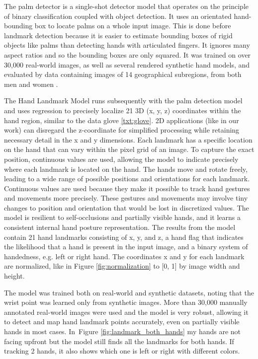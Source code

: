 The palm detector is a single-shot detector model that
operates on the principle of binary classification coupled with object detection. It uses an orientated hand-bounding box to locate palms on a whole input image. This is done before landmark detection because it is easier to estimate bounding boxes of rigid objects like palms than detecting hands with articulated fingers. It ignores many aspect ratios and so the bounding boxes are only squared. It was trained on over 30,000 real-world images, as well as several rendered synthetic hand models, and evaluated by data containing images of 14 geographical subregions, from both men and women \cite{GoogleHandLandmarker}.

The Hand Landmark Model runs subsequently with the palm detection model and uses regression to precisely localize 21 3D (x, y, z) coordinates within the hand region, similar to the data glove \ref{txt:glove}. 2D applications (like in our work) can disregard the z-coordinate for simplified processing while retaining necessary detail in the x and y dimensions. Each landmark has a specific location on the hand that can vary within the pixel grid of an image. To capture the exact position, continuous values are used, allowing the model to indicate precisely where each landmark is located on the hand. The hands move and rotate freely, leading to a wide range of possible positions and orientations for each landmark. Continuous values are used because they make it possible to track hand gestures and movements more precisely. These gestures and movements may involve tiny changes to position and orientation that would be lost in discretized values.
The model is resilient to self-occlusions and partially visible hands, and it learns a consistent internal hand posture representation. The results from the model contain 21 hand landmarks consisting of x, y, and z, a hand flag that indicates the likelihood that a hand is present in the input image, and a binary system of handedness, e.g. left or right hand.
The coordinates x and y for each landmark are normalized, like in Figure \ref{fig:normalization} to [0, 1] by image width and height. 

The model was trained both on real-world and synthetic datasets, noting that the wrist point was learned only from synthetic images. More than 30,000 manually annotated real-world images were used and the model is very robust, allowing it to detect and map hand landmark points accurately, even on partially visible hands in most cases. In~Figure
\ref{fig:landmark_both_hands} my hands are not facing upfront but the model still finds all the landmarks for both hands. If tracking 2 hands, it also shows which one is left or right with different colors.

